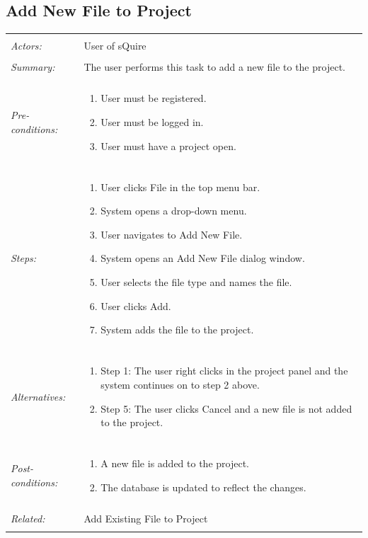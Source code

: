 \documentclass[11pt]{report}
\begin{document}
\subsection{Add New File to Project}
\begin{tabular}{ p{2cm} p{12cm} }
\hline 
\\
 \textit{Actors:} & User of sQuire \\
 \\
 \textit{Summary:} & The user performs this task to add a new file to the project. \\
 \\
 \textit{Pre-conditions:} & \begin{enumerate}
  \item User must be registered.
  \item User must be logged in.
  \item User must have a project open.
 \end{enumerate} \\
 \\
 \textit{Steps:} & \begin{enumerate}
  \item User clicks File in the top menu bar.
  \item System opens a drop-down menu.
  \item User navigates to Add New File.
  \item System opens an Add New File dialog window.
  \item User selects the file type and names the file.
  \item User clicks Add.
  \item System adds the file to the project.
 \end{enumerate} \\
 \\
 \textit{Alternatives:} & \begin{enumerate}
  \item Step 1: The user right clicks in the project panel and the system continues on to step 2 above.
  \item Step 5: The user clicks Cancel and a new file is not added to the project.
 \end{enumerate} \\
 \\ 
 \textit{Post-conditions:} & \begin{enumerate}
  \item A new file is added to the project.
  \item The database is updated to reflect the changes.
 \end{enumerate} \\
 \\
 \textit{Related:} & Add Existing File to Project \\
 \\
\hline
\end{tabular} 
\newpage
\end{document}
